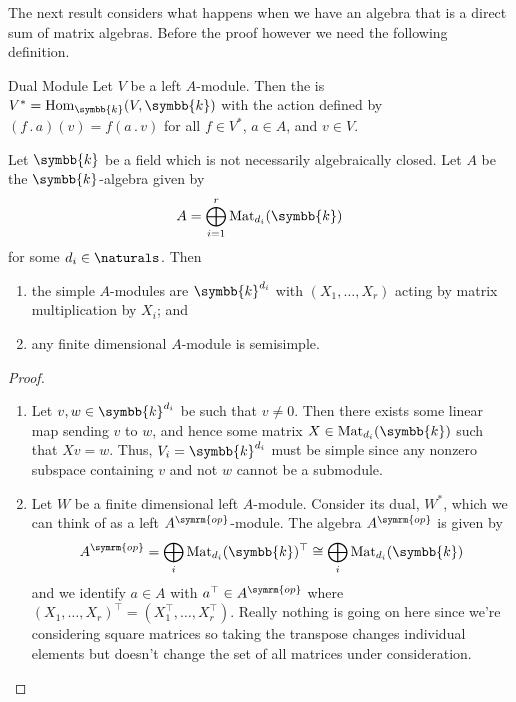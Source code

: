 \documentclass[fleqn]{NotesClass}
\renewcommand{\field}{\symbb{k}}
\DeclareMathOperator{\Hom}{Hom}
\newcommand{\action}{\mathbin{.}}
\newcommand{\op}{\symrm{op}}
\newcommand{\isomorphic}{\cong}
\newcommand{\trans}{\top}
\begin{document}
    The next result considers what happens when we have an algebra that is a direct sum of matrix algebras.
    Before the proof however we need the following definition.
    
    \begin{dfn}{Dual Module}{}
        Let \(V\) be a left \(A\)-module.
        Then the  is \(V^* = \Hom_{\field}(V, \field)\) with the action defined by \((f \action a)(v) = f(a \action v)\) for all \(f \in V^*\), \(a \in A\), and \(v \in V\).
    \end{dfn}
    
    \begin{thm}{}{}
        Let \(\field\) be a field which is not necessarily algebraically closed.
        Let \(A\) be the \(\field\)-algebra given by
        \begin{equation}
            A = \bigoplus_{i=1}^r \matrices{d_i}{\field}
        \end{equation}
        for some \(d_i \in \naturals\).
        Then
        \begin{enumerate}
            \item the simple \(A\)-modules are \(\field^{d_i}\) with \((X_1, \dotsc, X_r)\) acting by matrix multiplication by \(X_i\); and
            \item any finite dimensional \(A\)-module is semisimple.
        \end{enumerate}
        \begin{proof}
            \begin{enumerate}
                \item Let \(v, w \in \field^{d_i}\) be such that \(v \ne 0\).
                Then there exists some linear map sending \(v\) to \(w\), and hence some matrix \(X \in \matrices{d_i}{\field}\) such that \(Xv = w\).
                Thus, \(V_i = \field^{d_i}\) must be simple since any nonzero subspace containing \(v\) and not \(w\) cannot be a submodule.
                \item Let \(W\) be a finite dimensional left \(A\)-module.
                Consider its dual, \(W^*\), which we can think of as a left \(A^{\op}\)-module.
                The algebra \(A^{\op}\) is given by
                \begin{equation}
                    A^{\op} = \bigoplus_{i} \matrices{d_i}{\field}^{\trans} \isomorphic \bigoplus_i \matrices{d_i}{\field}
                \end{equation}
                and we identify \(a \in A\) with \(a^{\trans} \in A^{\op}\) where \((X_1, \dotsc, X_r)^{\trans} = (X_1^{\trans}, \dotsc, X_r^{\trans})\).
                Really nothing is going on here since we're considering square matrices so taking the transpose changes individual elements but doesn't change the set of all matrices under consideration.
                

\end{enumerate}
\end{proof}
\end{thm}
\end{document}
